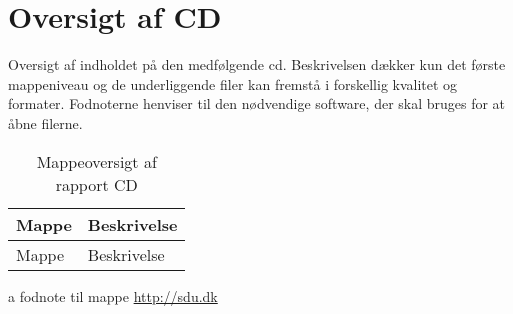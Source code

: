 \newpage
\section{Oversigt af CD}\label{bilag:cd}
Oversigt af indholdet på den medfølgende cd. Beskrivelsen dækker kun det første mappeniveau og de underliggende filer kan fremstå i forskellig kvalitet og formater. Fodnoterne henviser til den nødvendige software, der skal bruges for at åbne filerne.

\begin{table}[h!]
\centering
\caption{Mappeoversigt af rapport CD}
\label{tab:ordliste}
\begin{threeparttable}
\begin{tabular}{l l}
\toprule
\multicolumn{1}{l}{Mappe}       &
\multicolumn{1}{l}{Beskrivelse}  \\ 
\midrule
Mappe					& Beskrivelse \\
\bottomrule
\end{tabular}
\begin{tablenotes}
\item[a] fodnote til mappe  \url{http://sdu.dk}
\end{tablenotes}
\end{threeparttable}
\end{table}
\label{LastPage}
